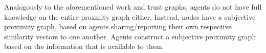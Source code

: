 \documentclass[11pt,a4paper]{report}
\theoremstyle{definition}
\newtheorem{definition}{Definition}[section]
\theoremstyle{theorem}
\theoremstyle{proposition}
\theoremstyle{corollary}
\theoremstyle{lemma}
\theoremstyle{example}
\theoremstyle{remark}
\begin{document}

\noindent{}Analogously to the aforementioned work and trust graphs, agents do not have full knowledge on the entire proxmity graph either. Instead, nodes have a subjective proximity graph, based on agents sharing/reporting their own respective similarity vectors to one another. Agents construct a subjective proximity graph based on the information that is available to them. \vspace{1em}\\
\end{document}
